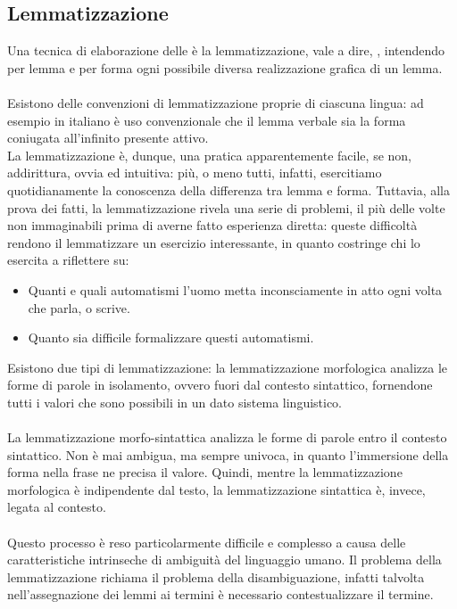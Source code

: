 \documentclass{article}
\theoremstyle{plain}
\theoremstyle{definition}
\begin{document}
\subsection{Lemmatizzazione}
Una tecnica di elaborazione delle  è la lemmatizzazione, vale a dire, , intendendo per lemma  e per forma ogni possibile diversa realizzazione grafica di un lemma.\footnotemark
{}
\\
\\
Esistono delle convenzioni di lemmatizzazione proprie di ciascuna lingua: ad esempio in italiano è uso convenzionale che il lemma verbale sia la forma coniugata all'infinito presente attivo.
\\
La lemmatizzazione è, dunque, una pratica apparentemente facile, se non, addirittura, ovvia ed intuitiva: più, o meno tutti, infatti, esercitiamo quotidianamente la conoscenza della differenza tra lemma e forma. Tuttavia, alla prova dei fatti, la lemmatizzazione rivela una serie di problemi, il più delle volte non immaginabili prima di averne fatto esperienza diretta: queste difficoltà rendono il lemmatizzare un esercizio interessante, in quanto costringe chi lo esercita a riflettere su:

\begin{itemize}  
\item Quanti e quali automatismi l'uomo metta inconsciamente in atto ogni volta che parla, o scrive.
\item Quanto sia difficile formalizzare questi automatismi.
\end{itemize}

Esistono due tipi di lemmatizzazione: la lemmatizzazione morfologica analizza le forme di parole in isolamento, ovvero fuori dal contesto sintattico, fornendone tutti i valori che sono possibili in un dato sistema linguistico. 
\\
\\
La lemmatizzazione morfo-sintattica analizza le forme di parole entro il contesto sintattico. Non è mai ambigua, ma sempre univoca, in quanto l'immersione della forma nella frase ne precisa il valore. Quindi, mentre la lemmatizzazione morfologica è indipendente dal testo, la lemmatizzazione sintattica è, invece, legata al contesto.
\\
\\
Questo processo è reso particolarmente difficile e complesso a causa delle caratteristiche intrinseche di ambiguità del linguaggio umano. Il problema della lemmatizzazione richiama il problema della disambiguazione, infatti talvolta nell'assegnazione dei lemmi ai termini è necessario contestualizzare il termine.
\end{document}
